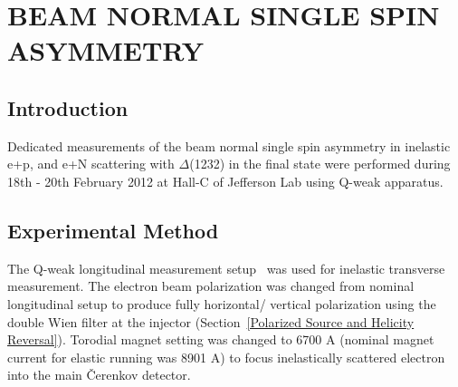 \chapter{BEAM NORMAL SINGLE SPIN ASYMMETRY}
\label{BEAM NORMAL SINGLE SPIN ASYMMETRY}

\section{Introduction}
\label{Introduction}
Dedicated measurements of the beam normal single spin asymmetry in inelastic e+p, and e+N scattering with $\Delta$(1232) in the final state were performed during 18th - 20th February 2012 at Hall-C of Jefferson Lab using Q-weak apparatus.


\section{Experimental Method}
\label{Experimental Method}

The Q-weak longitudinal measurement setup~\cite{qweak_proposal_2007} was used for inelastic transverse measurement. The electron beam polarization was changed from nominal longitudinal setup to produce fully horizontal/ vertical polarization using the double Wien filter at the injector (Section~\ref{Polarized Source and Helicity Reversal}). Torodial magnet setting was changed to 6700 A (nominal magnet current for elastic running was 8901 A) to focus inelastically scattered electron into the main \v{C}erenkov detector. 


